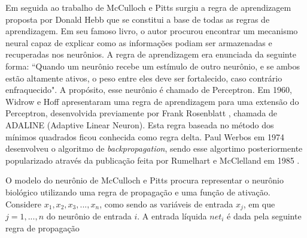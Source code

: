 Em seguida ao trabalho de McCulloch e Pitts surgiu a regra de aprendizagem proposta por Donald Hebb \cite{hebb1949organization} que se constitui a base de todas as regras de aprendizagem. Em seu famoso livro, o autor procurou encontrar um mecanismo neural capaz de explicar como as informações podiam ser armazenadas e recuperadas nos neurônios. A regra de aprendizagem era enunciada da seguinte forma: ``Quando um neurônio recebe um estímulo de outro neurônio, e se ambos estão altamente ativos, o peso entre eles deve ser fortalecido, caso contrário enfraquecido". A propósito, esse neurônio é chamado de Perceptron. Em 1960, Widrow e Hoff \cite{widrow1960adaptive} apresentaram uma regra de aprendizagem para uma extensão do Perceptron, desenvolvida previamente por Frank Rosenblatt \cite{rosenblatt1960perceptron}, chamada de ADALINE (Adaptive Linear Neuron). Esta regra baseada no método dos mínimos quadrados ficou conhecida como regra delta. Paul Werbos em 1974 \cite{Werbos74} desenvolveu o algoritmo de \textit{backpropagation}, sendo esse algortimo posteriormente popularizado através da publicação feita por Rumelhart e McClelland em 1985 \cite{rumelhart1985learning}.

O modelo do neurônio de McCulloch e Pitts procura representar o neurônio biológico utilizando uma regra de propagação e uma função de ativação. Considere $x_1, x_2, x_3, ..., x_n$, como sendo as variáveis de entrada $x_j$, em que $j = 1,...,n$ do neurônio de entrada $i$. A entrada líquida $net_i$ \label{symbol:neti} é dada pela seguinte regra de propagação

